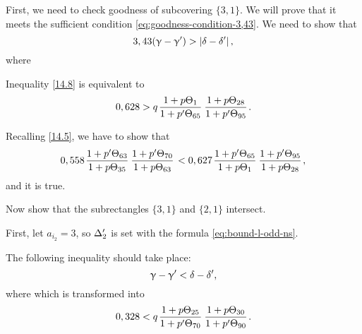 First, we need to check goodness of subcovering $\{3,1\}$.
We will prove that it meets the sufficient condition \ref{eq:goodness-condition-3,43}.
We need to show that
\begin{equation}\label{14.8}
	3,43 (\upgamma - \upgamma') > \left| \delta - \delta' \right|,
\end{equation}
where

Inequality \ref{14.8} is equivalent to
\begin{equation}
	0,628 > q \up{1}{65} \up{28}{95}.
\end{equation}

Recalling \ref{14.5}, we have to show that
\begin{equation*}
	0,558 \pu{63}{35} \pu{70}{63}
	< 0,627 \pu{65}{1} \pu{95}{28},
\end{equation*}
and it is true.

Now show that the subrectangles $\{3,1\}$ and $\{2, 1\}$ intersect.

First, let $a_{i_2} = 3$, so $\Delta_2'$ is set with the formula \ref{eq:bound-l-odd-ns}.

The following inequality should take place:
\begin{equation*}
	\upgamma - \upgamma' < \delta - \delta',
\end{equation*}
where
which is transformed into
\begin{equation}
	0,328 < q \up{25}{70} \up{30}{90}.
\end{equation}

